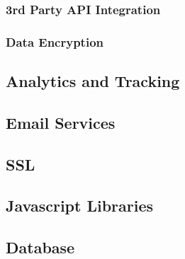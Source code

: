 \documentclass[letterpaper,11pt,2p]{elsarticle}
\begin{document}
\subsubsection{ 3rd Party API Integration}
\label{subsec1}





\subsubsection{ Data Encryption}
\label{subsec1}





\subsection{ Analytics and Tracking}
\label{subsec1}





\subsection{ Email Services}
\label{subsec1}





\subsection{ SSL}
\label{subsec1}





\subsection{ Javascript Libraries}
\label{subsec1}





\subsection{ Database}
\label{subsec1}
\end{document}
